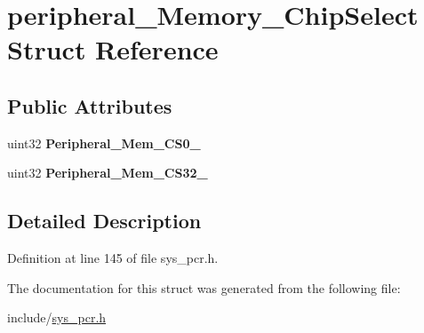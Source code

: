 \hypertarget{structperipheral__Memory__ChipSelect}{}\section{peripheral\+\_\+\+Memory\+\_\+\+Chip\+Select Struct Reference}
\label{structperipheral__Memory__ChipSelect}
\subsection*{Public Attributes}
\begin{DoxyCompactItemize}
\item 
\mbox{\label{structperipheral__Memory__ChipSelect_a8fc97a8af0abd4334b9f3855cbe2633b}} 
uint32 {\bfseries Peripheral\+\_\+\+Mem\+\_\+\+C\+S0\+\_}
\item 
\mbox{\label{structperipheral__Memory__ChipSelect_a22c2d3a419746d3bde6a6426209e8cf7}} 
uint32 {\bfseries Peripheral\+\_\+\+Mem\+\_\+\+C\+S32\+\_}
\end{DoxyCompactItemize}


\subsection{Detailed Description}


Definition at line 145 of file sys\+\_\+pcr.\+h.



The documentation for this struct was generated from the following file\+:\begin{DoxyCompactItemize}
\item 
include/\mbox{\hyperlink{sys__pcr_8h}{sys\+\_\+pcr.\+h}}\end{DoxyCompactItemize}
